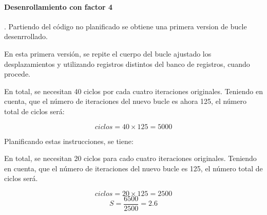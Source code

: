 \paragraph{Desenrollamiento con factor 4}.
Partiendo del código no planificado se obtiene una primera
version de bucle desenrrollado.



En esta primera versión, se repite el cuerpo del bucle ajustado los
desplazamientos y utilizando registros distintos del banco de registros,
cuando procede.

En total, se necesitan 40 ciclos por cada cuatro iteraciones originales.
Teniendo en cuenta, que el número de iteraciones del nuevo bucle es ahora 125,
el número total de ciclos será:

\[
ciclos = 40 \times 125 = 5000
\]

Planificando estas instrucciones, se tiene:



En total, se necesitan 20 ciclos para cado cuatro iteraciones originales.
Teniendo en cuenta, que el número de iteraciones del nuevo bucle es 125,
el número total de ciclos será.

\[
ciclos = 20 \times 125 = 2500
\]
\[
S = \frac{6500}{2500} = 2.6
\]
